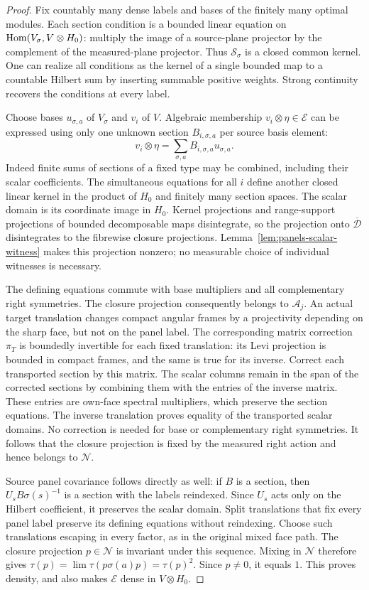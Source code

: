 \begin{proof}
Fix countably many dense labels and bases of the finitely many optimal
modules.  Each section condition is a bounded linear equation on
$\operatorname{Hom}(V_\sigma,V\otimes H_0)$: multiply the image of a source-plane
projector by the complement of the measured-plane projector.  Thus
$\mathscr S_\sigma$ is a closed common kernel.  One can realize all
conditions as the kernel of a single bounded map to a countable Hilbert
sum by inserting summable positive weights.  Strong continuity recovers
the conditions at every label.

Choose bases $u_{\sigma,a}$ of $V_\sigma$ and $v_i$ of $V$.  Algebraic
membership $v_i\otimes\eta\in\mathcal E$ can be expressed using only
one unknown section $B_{i,\sigma,a}$ per source basis element:
\[
 v_i\otimes\eta=\sum_{\sigma,a}B_{i,\sigma,a}u_{\sigma,a}.
\]
Indeed finite sums of sections of a fixed type may be combined, including
their scalar coefficients.  The simultaneous equations for all $i$
define another closed linear kernel in the product of $H_0$ and finitely
many section spaces.  The scalar domain is its coordinate image in
$H_0$.  Kernel projections and range-support projections of bounded
decomposable maps disintegrate, so the projection onto
$\overline{\mathscr D}$ disintegrates to the fibrewise closure
projections.  Lemma~\ref{lem:panels-scalar-witness} makes this projection
nonzero; no measurable choice of individual witnesses is necessary.

The defining equations commute with base multipliers and all
complementary right symmetries.  The closure projection consequently
belongs to $\mathcal A_j$.  An actual target translation changes compact
angular frames by a projectivity depending on the sharp face, but not on
the panel label.  The corresponding matrix correction $\pi_T$ is
boundedly invertible for each fixed translation: its Levi projection is
bounded in compact frames, and the same is true for its inverse.  Correct
each transported section by this matrix.  The scalar columns remain in
the span of the corrected sections by combining them with the entries of
the inverse matrix.  These entries are own-face spectral multipliers,
which preserve the section equations.  The inverse translation proves
equality of the transported scalar domains.  No correction is needed
for base or complementary right symmetries.  It follows that the closure
projection is fixed by the measured right action and hence belongs to
$\mathcal N$.

Source panel covariance follows directly as well: if $B$ is a section,
then $U_sB\sigma(s)^{-1}$ is a section with the labels reindexed.  Since
$U_s$ acts only on the Hilbert coefficient, it preserves the scalar
domain.  Split translations that fix every panel label preserve its
defining equations without reindexing.  Choose such translations
escaping in every factor, as in the original mixed face path.  The
closure projection $p\in\mathcal N$ is invariant under this sequence.
Mixing in $\mathcal N$ therefore gives
$\tau(p)=\lim\tau(p\sigma(a)p)=\tau(p)^2$.
Since $p\ne0$, it equals $1$.  This proves density, and also makes
$\mathcal E$ dense in $V\otimes H_0$.
\end{proof}

